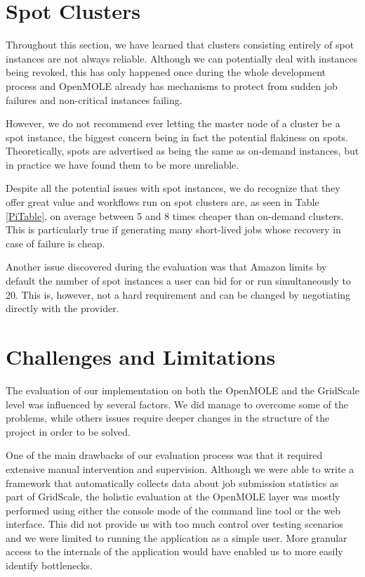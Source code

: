 \section{Spot Clusters}

Throughout this section, we have learned that clusters consisting entirely of spot instances are not always reliable. Although we can potentially deal with instances being revoked, this has only happened once during the whole development process and OpenMOLE already has mechanisms to protect from sudden job failures and non-critical instances failing.

However, we do not recommend ever letting the master node of a cluster be a spot instance, the biggest concern being in fact the potential flakiness on spots. Theoretically, spots are advertised as being the same as on-demand instances, but in practice we have found them to be more unreliable.

Despite all the potential issues with spot instances, we do recognize that they offer great value and workflows run on spot clusters are, as seen in Table \ref{PiTable}, on average between 5 and 8 times cheaper than on-demand clusters. This is particularly true if generating many short-lived jobs whose recovery in case of failure is cheap.

Another issue discovered during the evaluation was that Amazon limits by default the number of spot instances a user can bid for or run simultaneously to 20. This is, however, not a hard requirement and can be changed by negotiating directly with the provider.

\section{Challenges and Limitations}

The evaluation of our implementation on both the OpenMOLE and the GridScale level was influenced by several factors. We did manage to overcome some of the problems, while others issues require deeper changes in the structure of the project in order to be solved.

One of the main drawbacks of our evaluation process was that it required extensive manual intervention and supervision. Although we were able to write a framework that automatically collects data about job submission statistics as part of GridScale, the holistic evaluation at the OpenMOLE layer was mostly performed using either the console mode of the command line tool or the web interface. This did not provide us with too much control over testing scenarios and we were limited to running the application as a simple user. More granular access to the internals of the application would have enabled us to more easily identify bottlenecks.

